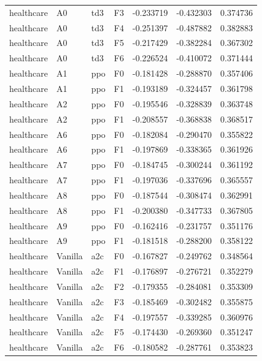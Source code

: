 \begin{tabular}{llllrrr}
healthcare &      A0 &       td3 &  F3 & -0.233719 & -0.432303 &  0.374736 \\
healthcare &      A0 &       td3 &  F4 & -0.251397 & -0.487882 &  0.382883 \\
healthcare &      A0 &       td3 &  F5 & -0.217429 & -0.382284 &  0.367302 \\
healthcare &      A0 &       td3 &  F6 & -0.226524 & -0.410072 &  0.371444 \\
healthcare &      A1 &       ppo &  F0 & -0.181428 & -0.288870 &  0.357406 \\
healthcare &      A1 &       ppo &  F1 & -0.193189 & -0.324457 &  0.361798 \\
healthcare &      A2 &       ppo &  F0 & -0.195546 & -0.328839 &  0.363748 \\
healthcare &      A2 &       ppo &  F1 & -0.208557 & -0.368838 &  0.368517 \\
healthcare &      A6 &       ppo &  F0 & -0.182084 & -0.290470 &  0.355822 \\
healthcare &      A6 &       ppo &  F1 & -0.197869 & -0.338365 &  0.361926 \\
healthcare &      A7 &       ppo &  F0 & -0.184745 & -0.300244 &  0.361192 \\
healthcare &      A7 &       ppo &  F1 & -0.197036 & -0.337696 &  0.365557 \\
healthcare &      A8 &       ppo &  F0 & -0.187544 & -0.308474 &  0.362991 \\
healthcare &      A8 &       ppo &  F1 & -0.200380 & -0.347733 &  0.367805 \\
healthcare &      A9 &       ppo &  F0 & -0.162416 & -0.231757 &  0.351176 \\
healthcare &      A9 &       ppo &  F1 & -0.181518 & -0.288200 &  0.358122 \\
healthcare & Vanilla &       a2c &  F0 & -0.167827 & -0.249762 &  0.348564 \\
healthcare & Vanilla &       a2c &  F1 & -0.176897 & -0.276721 &  0.352279 \\
healthcare & Vanilla &       a2c &  F2 & -0.179355 & -0.284081 &  0.353309 \\
healthcare & Vanilla &       a2c &  F3 & -0.185469 & -0.302482 &  0.355875 \\
healthcare & Vanilla &       a2c &  F4 & -0.197557 & -0.339285 &  0.360976 \\
healthcare & Vanilla &       a2c &  F5 & -0.174430 & -0.269360 &  0.351247 \\
healthcare & Vanilla &       a2c &  F6 & -0.180582 & -0.287761 &  0.353823 \\

\end{tabular}
